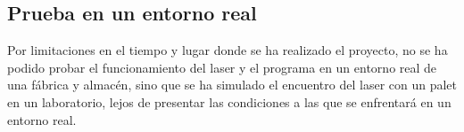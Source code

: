 \subsection{Prueba en un entorno real}
Por limitaciones en el tiempo y lugar donde se ha realizado el proyecto, no se ha podido probar el funcionamiento del laser y el programa en un entorno real de una fábrica y almacén, sino que se ha simulado el encuentro del laser con un palet en un laboratorio, lejos de presentar las condiciones a las que se enfrentará en un entorno real.






